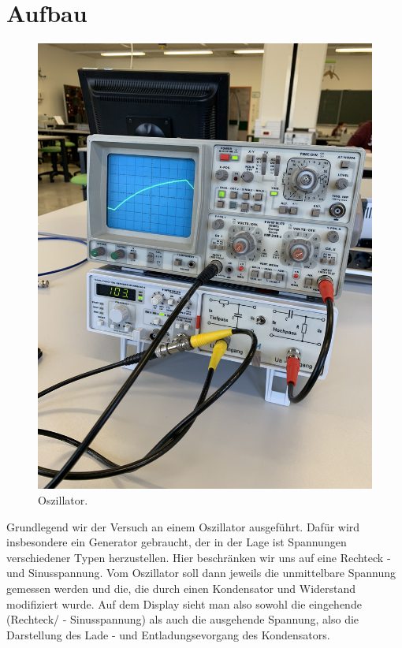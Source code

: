\newpage
\section{Aufbau}

\begin{figure}
        \includegraphics[scale=0.05]{bilder/oszillator.png}
        \caption{Oszillator.}
        \label{fig:aufbau}          
\end{figure}

Grundlegend wir der Versuch an einem Oszillator ausgeführt.
Dafür wird insbesondere ein Generator gebraucht, der in der Lage ist Spannungen verschiedener 
Typen herzustellen. Hier beschränken wir uns auf eine Rechteck - und Sinusspannung. 
Vom Oszillator soll dann jeweils die unmittelbare Spannung gemessen werden und die, 
die durch einen Kondensator und Widerstand modifiziert wurde.
Auf dem Display sieht man also sowohl die eingehende (Rechteck/ - Sinusspannung) als 
auch die ausgehende Spannung, also die Darstellung des Lade - und Entladungsevorgang des Kondensators.

